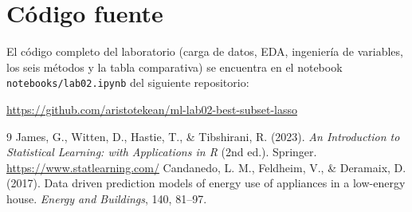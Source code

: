 \documentclass[11pt,a4paper]{article}
\begin{document}
\appendix
\section{Código fuente}

El código completo del laboratorio (carga de datos, EDA, ingeniería de variables, los seis
métodos y la tabla comparativa) se encuentra en el notebook \texttt{notebooks/lab02.ipynb} del
siguiente repositorio:

\begin{center}
  \url{https://github.com/aristotekean/ml-lab02-best-subset-lasso}
\end{center}

\begin{thebibliography}{9}
   James, G., Witten, D., Hastie, T., \& Tibshirani, R. (2023).
    \emph{An Introduction to Statistical Learning: with Applications in R} (2nd ed.). Springer.
    \url{https://www.statlearning.com/}
   Candanedo, L. M., Feldheim, V., \& Deramaix, D. (2017).
    Data driven prediction models of energy use of appliances in a low-energy house.
    \emph{Energy and Buildings}, 140, 81--97.
\end{thebibliography}
\end{document}
